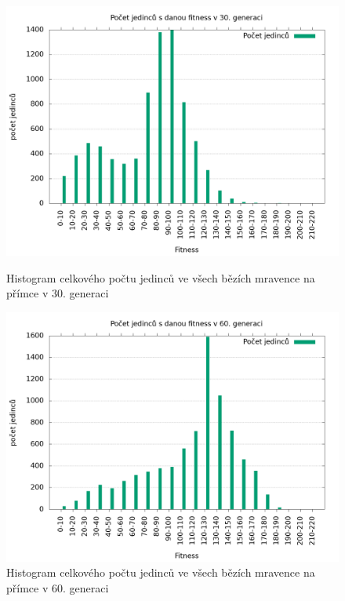 \begin{figure}[h]
    \begin{minipage}[c]{0.48\linewidth}
        \includegraphics[width=\linewidth]{obrazky/mravenec_primka_fitnessHistogram30.png}
        \caption{Histogram celkového počtu jedinců ve všech bězích mravence na přímce v 30. generaci}
    \end{minipage}
    \hfill
    \begin{minipage}[c]{0.48\linewidth}
        \includegraphics[width=\linewidth]{obrazky/mravenec_primka_fitnessHistogram60.png}
        \caption{Histogram celkového počtu jedinců ve všech bězích mravence na přímce v 60. generaci}
    \end{minipage}
\end{figure}


